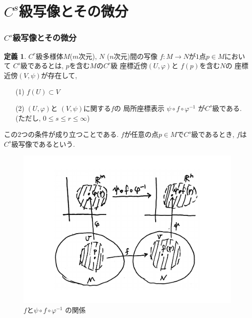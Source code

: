 \documentclass[dvipdfmx,cjk]{beamer}
\theoremstyle{definition}
\newtheorem{dfn}{\textbf{ 定義 }}
\begin{document}
\section{$C^s$級写像とその微分}
\begin{frame}
    \frametitle{$C^s$級写像とその微分}
  \begin{dfn}\label{def:C^s map}
    $C^r$級多様体$M$($m$次元), $N$
    ($n$次元)間の写像
    $f:M\to N$が$1$点$p\in M$において
    $C^s$級であるとは, $p$を含む$M$の$C^r$級
    座標近傍$(U,\varphi)$と
    $f(p)$を含む$N$の
    座標近傍$(V,\psi)$が存在して, 
    \begin{itemize}
        \item[(1)]$f(U)\subset V$
        \item[(2)]$(U,\varphi)$と
        $(V,\psi)$に関する$f$の
        局所座標表示
        $\psi\circ f\circ \varphi^{-1}$
        が$C^s$級である.
        (ただし, $0\leq s \leq r \leq \infty$) 
    \end{itemize}
    この$2$つの条件が成り立つことである. 
    $f$が任意の点$p\in M$で$C^s$級であるとき, 
    $f$は$C^s$級写像であるという. 
  \end{dfn}
  \begin{figure}[H]
    \centering
    \includegraphics[keepaspectratio, scale=0.15]
         {Csmap.pdf}
    \caption{$f$と$\psi\circ f\circ \varphi^{-1}$
    の関係}
    \label{Csmap}
  \end{figure}
\end{frame}
\end{document}
